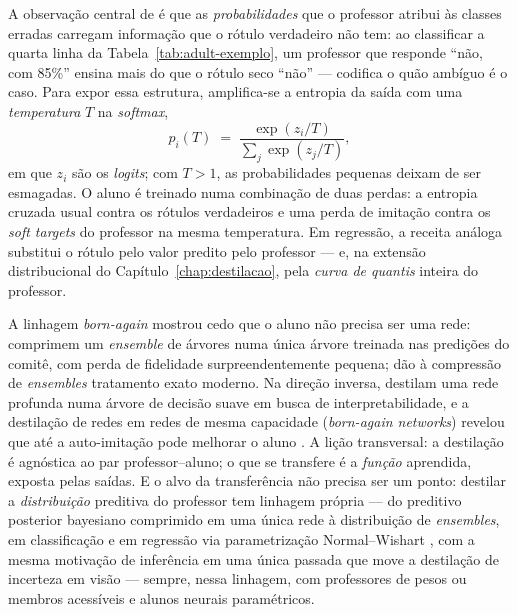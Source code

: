 A observação central de \citet{hinton2015} é que as \emph{probabilidades}
que o professor atribui às classes erradas carregam informação que o rótulo
verdadeiro não tem: ao classificar a quarta linha da
Tabela~\ref{tab:adult-exemplo}, um professor que responde ``não, com 85\%''
ensina mais do que o rótulo seco ``não'' --- codifica o quão ambíguo é o
caso. Para expor essa estrutura, amplifica-se a entropia da saída com uma
\emph{temperatura} $T$ na \emph{softmax},
\begin{equation}
  p_i(T) \;=\;
  \frac{\exp(z_i / T)}{\sum_j \exp(z_j / T)},
  \label{eq:temperatura}
\end{equation}
em que $z_i$ são os \emph{logits}; com $T > 1$, as probabilidades pequenas
deixam de ser esmagadas. O aluno é treinado numa combinação de duas perdas:
a entropia cruzada usual contra os rótulos verdadeiros e uma perda de
imitação contra os \emph{soft targets} do professor na mesma temperatura.
Em regressão, a receita análoga substitui o rótulo pelo valor predito pelo
professor --- e, na extensão distribucional do Capítulo~\ref{chap:destilacao}, pela \emph{curva
de quantis} inteira do professor.

A linhagem \emph{born-again} mostrou
cedo que o aluno não precisa ser uma rede: \citet{breiman1996} comprimem um
\emph{ensemble} de árvores numa única árvore treinada nas predições do
comitê, com perda de fidelidade surpreendentemente pequena;
\citet{vidal2020} dão à compressão de \emph{ensembles} tratamento exato
moderno. Na direção inversa, \citet{frosst2017} destilam uma rede profunda
numa árvore de decisão suave em busca de interpretabilidade, e a destilação
de redes em redes de mesma capacidade (\emph{born-again networks}) revelou
que até a auto-imitação pode melhorar o aluno \citep{furlanello2018}. A lição
transversal: a destilação é agnóstica ao par professor--aluno; o que se
transfere é a \emph{função} aprendida, exposta pelas saídas. E o alvo da
transferência não precisa ser um ponto: destilar a \emph{distribuição}
preditiva do professor tem linhagem própria --- do preditivo posterior
bayesiano comprimido em uma única rede \citep{korattikara2015} à
distribuição de \emph{ensembles}, em classificação \citep{malinin2020end2}
e em regressão via parametrização Normal--Wishart \citep{malinin2020rpn},
com a mesma motivação de inferência em uma única passada que move a
destilação de incerteza em visão \citep{shen2021} --- sempre, nessa
linhagem, com professores de pesos ou membros acessíveis e alunos neurais
paramétricos.

